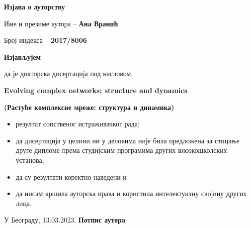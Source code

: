 
\cleardoublepage

\thispagestyle{empty}
\setlength{\parindent}{0pt}

\renewcommand{\headrulewidth}{0pt}


\normalsize

\mbox{}
\vspace{1cm}


\begin{center}
\begin{Large}\textbf{Изјава о ауторству}
\end{Large}\end{center}

\vspace{1.5cm}

Име и презиме аутора -- \textbf{Ана Вранић}

Број индекса -- \textbf{2017/8006}

\vspace{.7cm}

\begin{center}
\textbf{Изјављујем}            \end{center}

да је докторска дисертација под насловом 


\textbf{ Evolving complex networks: structure and dynamics}


\textbf{(Растуће комплексне мреже: структура и динамика)}

\begin{itemize}
 \item резултат сопственог истраживачког рада;
\item  да дисертација у целини 
ни у деловима није била предложена за стицање друге дипломе према студијским 
програмима других високошколских установа;
\item да су резултати коректно наведени и 
\item да нисам кршила ауторска права и користила интелектуалну својину 
других лица.
\end{itemize}

\vfill
 
У Београду, 13.03.2023.  \hfill  \textbf{Потпис
аутора\hspace{2cm}\mbox{}}

\vspace{.5cm}
\hspace{10cm}\hrulefill 

\hspace{\fill}


